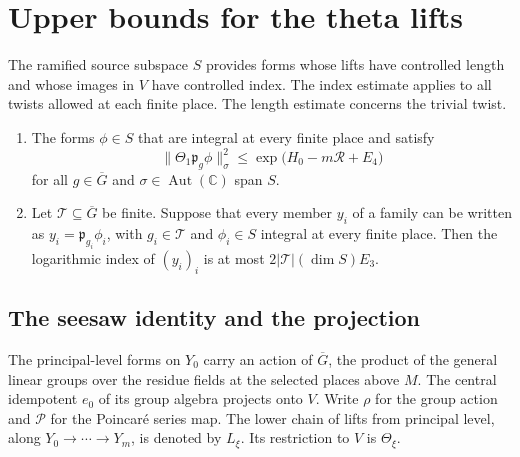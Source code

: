 \section{Upper bounds for the theta lifts}\label{sec:upper-bound}

The ramified source subspace \(S\) provides forms whose lifts have
controlled length and whose images in \(V\) have controlled index.
The index estimate applies to all twists allowed at each finite place.
The length estimate concerns the trivial twist.

\begin{theorem}\label{thm:upper-bound}
\begin{enumerate}
\item The forms \(\phi\in S\) that are integral at every finite place and satisfy
\[
  \|\Theta_1\mathfrak p_g\phi\|_\sigma^2
  \le \exp\!\bigl(H_0-m\mathcal R+E_4\bigr)
\]
for all \(g\in\overline G\) and \(\sigma\in\operatorname{Aut}(\mathbb C)\)
span \(S\).
\item Let \(\mathcal T\subseteq\overline G\) be finite.
Suppose that every member \(y_i\) of a family can be written as
\(y_i=\mathfrak p_{g_i}\phi_i\), with \(g_i\in\mathcal T\) and
\(\phi_i\in S\) integral at every finite place.
Then the logarithmic index of \((y_i)_i\) is at most \(2|\mathcal T|(\dim S)E_3\).
\end{enumerate}
\end{theorem}

\subsection{The seesaw identity and the projection}

The principal-level forms on \(Y_0\) carry an action of \(\overline G\),
the product of the general linear groups over the residue fields at the
selected places above \(M\). The central idempotent \(e_0\) of its group
algebra projects onto \(V\). Write \(\rho\) for the group action and
\(\mathcal P\) for the Poincar\'e series map. The lower chain of lifts
from principal level, along \(Y_0\to\cdots\to Y_m\), is denoted by \(L_\xi\).
Its restriction to \(V\) is \(\Theta_\xi\).

